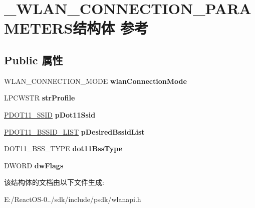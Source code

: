 \hypertarget{struct___w_l_a_n___c_o_n_n_e_c_t_i_o_n___p_a_r_a_m_e_t_e_r_s}{}\section{\+\_\+\+W\+L\+A\+N\+\_\+\+C\+O\+N\+N\+E\+C\+T\+I\+O\+N\+\_\+\+P\+A\+R\+A\+M\+E\+T\+E\+R\+S结构体 参考}
\label{struct___w_l_a_n___c_o_n_n_e_c_t_i_o_n___p_a_r_a_m_e_t_e_r_s}
\subsection*{Public 属性}
\begin{DoxyCompactItemize}
\item 
\mbox{\label{struct___w_l_a_n___c_o_n_n_e_c_t_i_o_n___p_a_r_a_m_e_t_e_r_s_ac3e06d486e5acb45df256b9eecf18eb8}} 
W\+L\+A\+N\+\_\+\+C\+O\+N\+N\+E\+C\+T\+I\+O\+N\+\_\+\+M\+O\+DE {\bfseries wlan\+Connection\+Mode}
\item 
\mbox{\label{struct___w_l_a_n___c_o_n_n_e_c_t_i_o_n___p_a_r_a_m_e_t_e_r_s_ac03104ff955e984681e5ad1b3c84118a}} 
L\+P\+C\+W\+S\+TR {\bfseries str\+Profile}
\item 
\mbox{\label{struct___w_l_a_n___c_o_n_n_e_c_t_i_o_n___p_a_r_a_m_e_t_e_r_s_ab950a0a5c8f8e835e2ba5929d1475d30}} 
\hyperlink{struct___d_o_t11___s_s_i_d}{P\+D\+O\+T11\+\_\+\+S\+S\+ID} {\bfseries p\+Dot11\+Ssid}
\item 
\mbox{\label{struct___w_l_a_n___c_o_n_n_e_c_t_i_o_n___p_a_r_a_m_e_t_e_r_s_a165fc0c11fa88244c84fb5e8502e4de4}} 
\hyperlink{struct___d_o_t11___b_s_s_i_d___l_i_s_t}{P\+D\+O\+T11\+\_\+\+B\+S\+S\+I\+D\+\_\+\+L\+I\+ST} {\bfseries p\+Desired\+Bssid\+List}
\item 
\mbox{\label{struct___w_l_a_n___c_o_n_n_e_c_t_i_o_n___p_a_r_a_m_e_t_e_r_s_a5a90a1dbfdf9f4376eaa0a3bfc5fc0b2}} 
D\+O\+T11\+\_\+\+B\+S\+S\+\_\+\+T\+Y\+PE {\bfseries dot11\+Bss\+Type}
\item 
\mbox{\label{struct___w_l_a_n___c_o_n_n_e_c_t_i_o_n___p_a_r_a_m_e_t_e_r_s_aa335a0f1da27be6e725638dd1ac2299e}} 
D\+W\+O\+RD {\bfseries dw\+Flags}
\end{DoxyCompactItemize}


该结构体的文档由以下文件生成\+:\begin{DoxyCompactItemize}
\item 
E\+:/\+React\+O\+S-\/0../sdk/include/psdk/wlanapi.\+h\end{DoxyCompactItemize}
